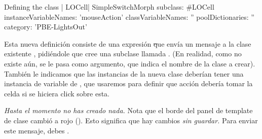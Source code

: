\documentclass[a4paper,10pt,twoside]{book}
\begin{document}
\begin{classdef}[firstClassDef]{Defining the class \ct| LOCell|}
SimpleSwitchMorph subclass: #LOCell
   instanceVariableNames: 'mouseAction'
   classVariableNames: ''
   poolDictionaries: ''
   category: 'PBE-LightsOut'
\end{classdef}


Esta nueva definición consiste de una expresión \st que envía un mensaje a la
clase existente , pidiéndole que cree una subclase llamada
. (En realidad, como  no existe aún, se le pasa 
  como argumento, que indica el nombre de la clase a 
crear). También le indicamos que las instancias de la nueva clase deberían 
tener una instancia de variable de , que usaremos para definir
que acción debería tomar la celda si se hiciera click sobre esta.



\emph {Hasta el momento no has creado nada.}
Nota que el borde del panel de template de clase cambió a rojo ().
Esto significa que hay cambios \emph {sin guardar.}
Para enviar este mensaje, debes . 


\end{document}
